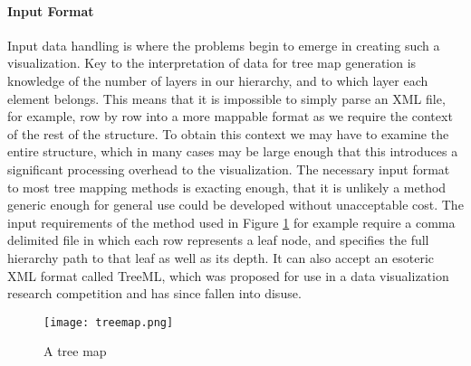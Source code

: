 \paragraph{Input Format}
Input data handling is where the problems begin to emerge in creating such a visualization. Key to the interpretation of data for tree map generation is knowledge of the number of layers in our hierarchy, and to which layer each element belongs. This means that it is impossible to simply parse an XML file, for example, row by row into a more mappable format as we require the context of the rest of the structure. To obtain this context we may have to examine the entire structure, which in many cases may be large enough that this introduces a significant processing overhead to the visualization. The necessary input format to most tree mapping methods is exacting enough, that it is unlikely a method generic enough for general use could be developed without unacceptable cost. The input requirements of the method used in Figure \ref{fig:treemap} for example require a comma delimited file in which each row represents a leaf node, and specifies the full hierarchy path to that leaf as well as its depth. It can also accept an esoteric XML format called TreeML, which was proposed for use in a data visualization research competition \cite{PlaisantCFekete2008} and has since fallen into disuse. 

\begin{figure}
	\centering
	\texttt{[image: treemap.png]}
	\caption{A tree map}
	\label{fig:treemap}
\end{figure}
